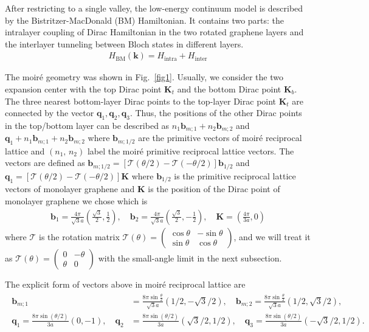 \documentclass[10pt, oneside]{article}
\newcommand{\te}{\theta}
\newcommand{\mr}[1]{\mathrm{#1}}
\newcommand{\p}[1]{\left(#1\right)}
\newcommand{\bb}[1]{\left[#1\right]}
\begin{document}
After restricting to a single valley, the low-energy continuum model is described by the Bistritzer-MacDonald (BM) Hamiltonian. It contains two parts: the intralayer coupling of Dirac Hamiltonian in the two rotated graphene layers and the interlayer tunneling between Bloch states in different layers.
\begin{align}
	H_{\mr{BM}} \p{\bm{k}} = H_{\mr{intra}} + H_{\mr{inter}}
\end{align}

The moir\'e geometry was shown in Fig.~{\ref{fig1}}. Usually, we consider the two expansion center with the top Dirac point \(\bm{K}_{t}\) and the bottom Dirac point \(\bm{K}_{b}\). The three nearest bottom-layer Dirac points to the top-layer Dirac point \(\bm{K}_t\) are connected by the vector \(\bm{q}_{1}, \bm{q}_2, \bm{q}_3\). Thus, the positions of the other Dirac points in the top/bottom layer can be described as \(n_1 \bm{b}_{m;1} + n_2 \bm{b}_{m;2}\) and \(\bm{q}_1 + n_1 \bm{b}_{m;1} + n_2 \bm{b}_{m;2}\) where \(\bm{b}_{m;1/2}\) are the primitive vectors of moir\'e reciprocal lattice  and \(\p{n_1, \, n_2}\) label the moir\'e primitive reciprocal lattice vectors. The vectors are defined as \(\bm{b}_{m;1/2} = \bb{\mathcal{T}\p{\te/2} - \mathcal{T} \p{-\te/2} } \bm{b}_{1/2}\) and \(\bm{q}_1 = \bb{\mathcal{T}\p{\te/2} - \mathcal{T} \p{-\te/2} } \bm{K}\) where \(\bm{b}_{1/2}\) is the primitive reciprocal lattice vectors of monolayer graphene and \(\bm{K}\) is the position of the Dirac point of monolayer graphene we chose which is 
\begin{align}
	\bm{b}_{1} = \frac{4 \pi}{\sqrt{3} a} \p{\frac{\sqrt{3}}{2} , \frac12}, \quad \bm{b}_{2} = \frac{4 \pi}{\sqrt{3} a}  \p{\frac{\sqrt{3}}{2}, - \frac12},\quad \bm{K} = \p{\frac{4 \pi}{3a}, 0}
\end{align}
where  \(\mathcal{T}\) is the rotation matrix \(\mathcal{T}\p{\te} = \begin{pmatrix}
	\cos \te & - \sin \te \\ \sin \te & \cos \te
\end{pmatrix}\), and we will treat it as \(\mathcal{T} \p{\te} = \begin{pmatrix}
	0 & -\te \\ \te & 0
\end{pmatrix}\) with the small-angle limit in the next subsection.

The explicit form of vectors above in moir\'e reciprocal lattice are
\begin{align}
	\begin{split}
	\bm{b}_{m;1} & = \frac{8 \pi \sin \frac{\te}{2}}{\sqrt{3 } a}  \p{1/2, -\sqrt{3}/2}, \quad \bm{b}_{m;2} = \frac{8 \pi \sin \frac{\te}{2}}{\sqrt{3 } a} \p{1/2, \sqrt{3}/2},  \\
	\bm{q}_{1}  = \frac{8 \pi \sin{\p{\te/2}}}{3a} \p{0, -1}, \quad
	\bm{q}_{2} & = \frac{8 \pi \sin{\p{\te/2}}}{3a} \p{\sqrt{3}/2, 1/2}, \quad
	\bm{q}_{3}  = \frac{8 \pi \sin{\p{\te/2}}}{3a} \p{-\sqrt{3}/2, 1/2}.
	\end{split}
\end{align}
\end{document}
